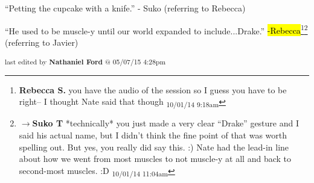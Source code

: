 
``Petting the cupcake with a knife.'' - Suko (referring to Rebecca)



``He used to be muscle-y until our world expanded to include...Drake.'' \hl{-Rebecca}\footnote{\textbf{Rebecca S. }you have the audio of the session so I guess you have to be right-- I thought Nate said that though \textsubscript{10/01/14 9:18am}}\footnote{$\rightarrow$\textbf{Suko T }*technically* you just made a very clear ``Drake'' gesture and I said his actual name, but I didn't think the fine point of that was worth spelling out.  But yes, you really did say this. :) Nate had the lead-in line about how we went from most muscles to not muscle-y at all and back to second-most muscles. :D \textsubscript{10/01/14 11:04am}} (referring to Javier)


\vspace{\fill}

\begin{flushright}
\textsubscript{last edited by \textbf{Nathaniel Ford} @ 05/07/15 4:28pm}
\end{flushright}

